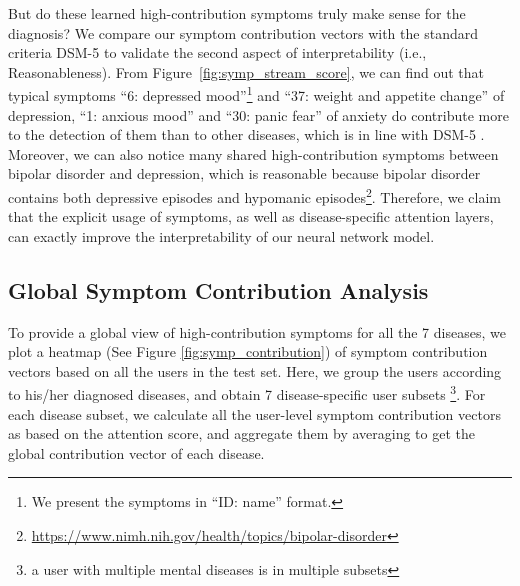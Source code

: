 But do these learned high-contribution symptoms truly make sense for the diagnosis?  We compare our symptom contribution vectors with the standard criteria DSM-5 to validate the second aspect of interpretability (i.e., Reasonableness). 
From Figure~\ref{fig:symp_stream_score}, we can find out that typical symptoms ``6: depressed mood''\footnote{We present the symptoms in ``ID: name'' format.} and ``37: weight and appetite change'' of depression, ``1: anxious mood'' and ``30: panic fear'' of anxiety do contribute more to the detection of them than to other diseases, which is in line with  DSM-5 . Moreover, we can also notice many shared high-contribution symptoms between bipolar disorder and depression, which is reasonable because bipolar disorder contains both depressive episodes and hypomanic episodes\footnote{\url{https://www.nimh.nih.gov/health/topics/bipolar-disorder}}. 
Therefore, we claim that the explicit usage of symptoms, as well as disease-specific attention layers, can exactly improve the interpretability of our neural network model.

\subsection{Global Symptom Contribution Analysis}
To provide a global view of high-contribution symptoms for all the 7 diseases, we plot a heatmap (See Figure \ref{fig:symp_contribution}) of symptom contribution vectors based on all the users in the test set. 
Here, we group the users according to his/her diagnosed diseases, and obtain 7 disease-specific user subsets \footnote{a user with multiple mental diseases is in multiple subsets}. For each disease subset, we calculate all the user-level symptom contribution vectors as  based on the attention score, and aggregate them by averaging to get the global contribution vector of each disease. 



